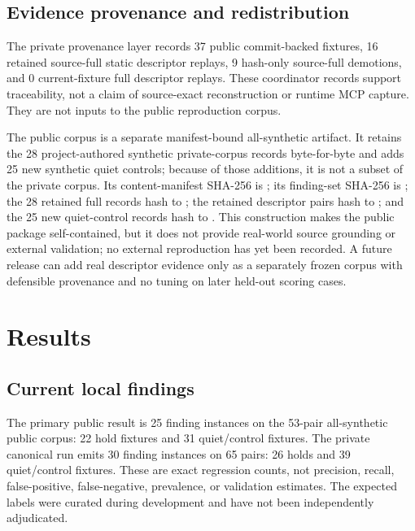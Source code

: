 \documentclass[11pt,letterpaper]{article}
\begin{document}
\subsection{Evidence provenance and redistribution}

The private provenance layer records 37 public commit-backed fixtures, 16 retained source-full static descriptor replays, 9 hash-only source-full demotions, and 0 current-fixture full descriptor replays. These coordinator records support traceability, not a claim of source-exact reconstruction or runtime MCP capture. They are not inputs to the public reproduction corpus.

The public corpus is a separate manifest-bound all-synthetic artifact. It retains the 28 project-authored synthetic private-corpus records byte-for-byte and adds 25 new synthetic quiet controls; because of those additions, it is not a subset of the private corpus. Its content-manifest SHA-256 is ; its finding-set SHA-256 is ; the 28 retained full records hash to ; the retained descriptor pairs hash to ; and the 25 new quiet-control records hash to . This construction makes the public package self-contained, but it does not provide real-world source grounding or external validation; no external reproduction has yet been recorded. A future release can add real descriptor evidence only as a separately frozen corpus with defensible provenance and no tuning on later held-out scoring cases.

\section{Results}

\subsection{Current local findings}

The primary public result is 25 finding instances on the 53-pair all-synthetic public corpus: 22 hold fixtures and 31 quiet/control fixtures. The private canonical run emits 30 finding instances on 65 pairs: 26 holds and 39 quiet/control fixtures. These are exact regression counts, not precision, recall, false-positive, false-negative, prevalence, or validation estimates. The expected labels were curated during development and have not been independently adjudicated.
\end{document}
